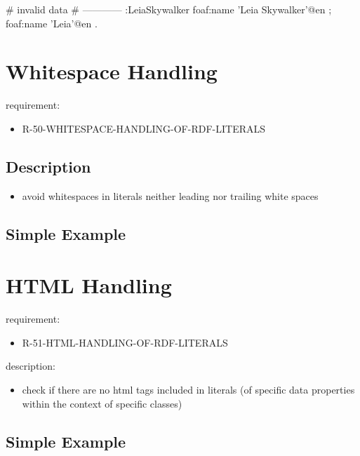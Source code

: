 \documentclass{llncs}
\begin{document}
\begin{ex}
# invalid data
# ------------
:LeiaSkywalker
    foaf:name 'Leia Skywalker'@en ;
    foaf:name 'Leia'@en .
\end{ex}

\section{Whitespace Handling}

requirement:

\begin{itemize}
	\item R-50-WHITESPACE-HANDLING-OF-RDF-LITERALS
\end{itemize}

\subsection{Description}

\begin{itemize}
	\item avoid whitespaces in literals neither leading nor trailing white spaces
\end{itemize}

\subsection{Simple Example}

\section{HTML Handling}

requirement:

\begin{itemize}
	\item R-51-HTML-HANDLING-OF-RDF-LITERALS
\end{itemize}

description:

\begin{itemize}
	\item check if there are no html tags included in literals (of specific data properties within the context of specific classes)
\end{itemize}

\subsection{Simple Example}
\end{document}
